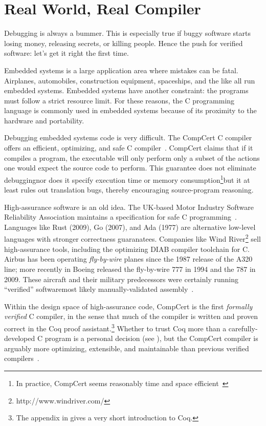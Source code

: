 \section{Real World, Real Compiler}

Debugging is always a bummer.
This is especially true if buggy software starts losing money, releasing secrets, or killing people.
Hence the push for verified software: let's get it right the first time.

Embedded systems is a large application area where mistakes can be fatal.
Airplanes, automobiles, construction equipment, spaceships, and the like all run embedded systems.
Embedded systems have another constraint: the programs must follow a strict resource limit.
For these reasons, the C programming language is commonly used in embedded systems because of its proximity to the hardware and portability.

Debugging embedded systems code is very difficult.
The CompCert C compiler offers an efficient, optimizing, and safe C compiler~\cite{l-verified}.
CompCert claims that if it compiles a program, the executable will only perform only a subset of the actions one would expect the source code to perform.
This guarantee does not eliminate debugging\textemdash nor does it specify execution time or memory consumption\footnote{In practice, CompCert seems reasonably time and space efficient~\cite{website,airbus-slides}}\textemdash but it at least rules out translation bugs, thereby encouraging source-program reasoning.

High-assurance software is an old idea.
The UK-based Motor Industry Software Reliability Association maintains a specification for safe C programming~\cite{misra-spec}.
Languages like Rust (2009), Go (2007), and Ada (1977) are alternative low-level languages with stronger correctness guaranatees.
Companies like Wind River\footnote{http://www.windriver.com/} sell high-assurance tools, including the optimizing DIAB compiler toolchain for C.
Airbus has been operating \emph{fly-by-wire} planes since the 1987 release of the A320 line; more recently in Boeing released the fly-by-wire 777 in 1994 and the 787 in 2009.
These aircraft and their military predecessors were certainly running ``verified'' software\textemdash most likely manually-validated assembly~\cite{}.

Within the design space of high-assurance code, CompCert is the first \emph{formally verified} C compiler, in the sense that much of the compiler is written and proven correct in the Coq proof assistant.\footnote{The appendix in  gives a very short introduction to Coq.}
Whether to trust Coq more than a carefully-developed C program is a personal decision (see ), but the CompCert compiler is arguably more optimizing, extensible, and maintainable than previous verified compilers~\cite{airbus-slides}.


